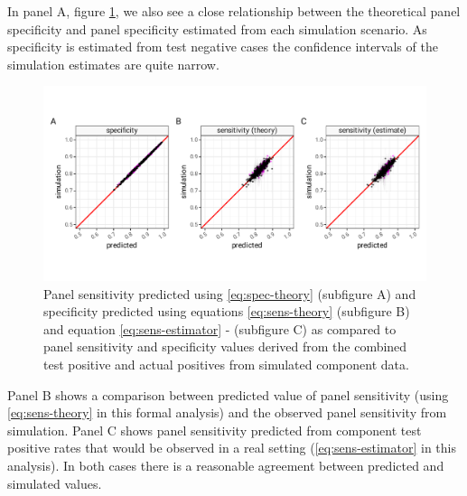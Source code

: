 \documentclass[a4paper, 12pt, twoside]{article}
\begin{document}
In panel A, figure \ref{fig:A4}, we also see a close relationship between the theoretical panel specificity and panel specificity estimated from each simulation scenario. As specificity is estimated from test negative cases the confidence intervals of the simulation estimates are quite narrow.

\begin{figure}[h!]
\centering
  \includegraphics{fig/qq-prediction-v-simulation.png}
  \caption{Panel sensitivity predicted using \eqref{eq:spec-theory} (subfigure A) and specificity predicted using equations \eqref{eq:sens-theory} (subfigure B) and equation \eqref{eq:sens-estimator} - (subfigure C) as compared to panel sensitivity and specificity values derived from the  combined test positive and actual positives from simulated component data.}
\label{fig:A4}
\end{figure}

Panel B shows a comparison between predicted value of panel sensitivity (using \eqref{eq:sens-theory} in this formal analysis) and the observed panel sensitivity from simulation. Panel C shows panel sensitivity predicted from component test positive rates that would be observed in a real setting (\eqref{eq:sens-estimator} in this analysis). In both cases there is a reasonable agreement between predicted and simulated values.
\end{document}
